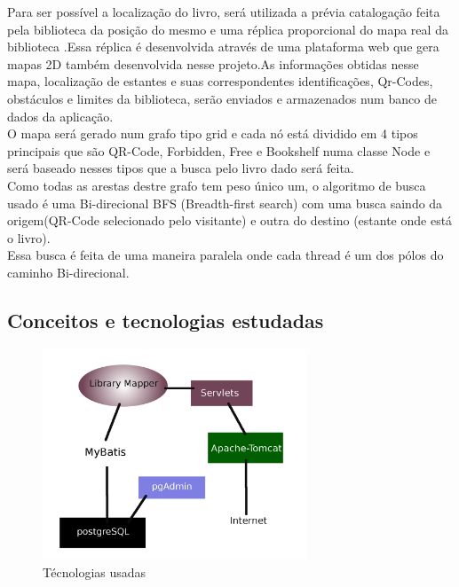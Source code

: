 \documentclass[a4paper,10pt]{article}
\begin{document}
   Para ser possível a localização do livro, será utilizada a prévia catalogação feita pela biblioteca da 
   posição do mesmo e uma réplica proporcional do mapa real da biblioteca .Essa réplica
   é desenvolvida através de uma plataforma web que gera mapas 2D também desenvolvida nesse projeto.As informações
   obtidas nesse mapa, localização de estantes e suas correspondentes identificações, Qr-Codes, obstáculos e limites
   da biblioteca, serão enviados e armazenados num banco de dados da aplicação.\\
   
   
   
   
   O mapa será gerado num grafo tipo grid e cada nó está dividido em 4 tipos principais que são QR-Code, Forbidden, Free e Bookshelf 
   numa classe Node e será baseado nesses tipos que a busca pelo livro dado será feita.\\

   Como todas as arestas destre grafo tem peso único um, o algoritmo de busca usado é uma Bi-direcional BFS (Breadth-first search) com uma busca saindo da origem(QR-Code
   selecionado pelo visitante) e outra do destino (estante onde está o livro).\\

Essa busca é feita de uma maneira paralela onde cada thread é um dos pólos do caminho Bi-direcional.\\ 
  
    \subsection{Conceitos e tecnologias estudadas}
	\begin{figure}[H]
	\centering
      	\includegraphics[width=0.70\textwidth]{./imgs/esquemaLibrary.png}
	\caption{Técnologias usadas}
	
      \end{figure}
\end{document}
